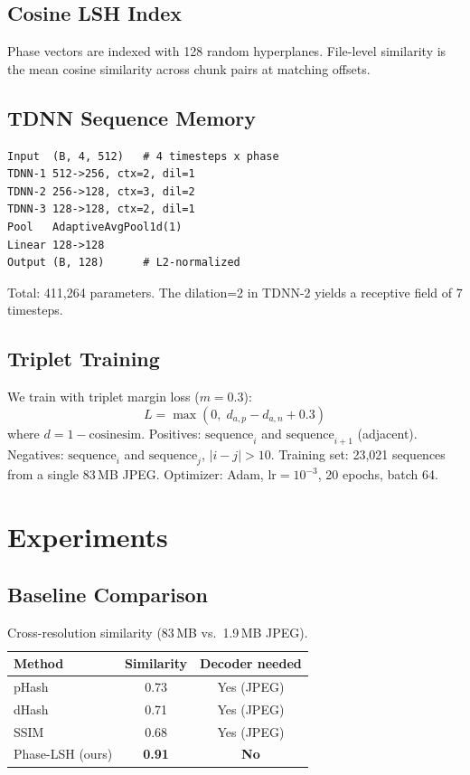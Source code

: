 \documentclass[10pt,twocolumn]{article}
\begin{document}
\subsection{Cosine LSH Index}
Phase vectors are indexed with 128 random hyperplanes. File-level similarity
is the mean cosine similarity across chunk pairs at matching offsets.

\subsection{TDNN Sequence Memory}
\begin{lstlisting}[caption={TDNN architecture},label={lst:tdnn}]
Input  (B, 4, 512)   # 4 timesteps x phase
TDNN-1 512->256, ctx=2, dil=1
TDNN-2 256->128, ctx=3, dil=2
TDNN-3 128->128, ctx=2, dil=1
Pool   AdaptiveAvgPool1d(1)
Linear 128->128
Output (B, 128)      # L2-normalized
\end{lstlisting}
Total: 411,264 parameters. The dilation=2 in TDNN-2 yields a receptive
field of 7 timesteps.

\subsection{Triplet Training}
We train with triplet margin loss ($m=0.3$):
$$L = \max(0,\; d_{a,p} - d_{a,n} + 0.3)$$
where $d = 1 - \text{cosinesim}$. Positives: $\text{sequence}_i$ and
$\text{sequence}_{i+1}$ (adjacent). Negatives: $\text{sequence}_i$ and
$\text{sequence}_j$, $|i-j|>10$. Training set: 23,021 sequences from a
single 83\,MB JPEG. Optimizer: Adam, $\text{lr}=10^{-3}$, 20 epochs, batch 64.

\section{Experiments}

\subsection{Baseline Comparison}
\begin{table}[h]
\caption{Cross-resolution similarity (83\,MB vs.\ 1.9\,MB JPEG).}
\label{tab:baseline}
\begin{tabular}{lcc}
\toprule
Method & Similarity & Decoder needed \\
\midrule
pHash          & 0.73 & Yes (JPEG) \\
dHash          & 0.71 & Yes (JPEG) \\
SSIM           & 0.68 & Yes (JPEG) \\
Phase-LSH (ours) & \textbf{0.91} & \textbf{No} \\
\bottomrule
\end{tabular}
\end{table}
\end{document}
